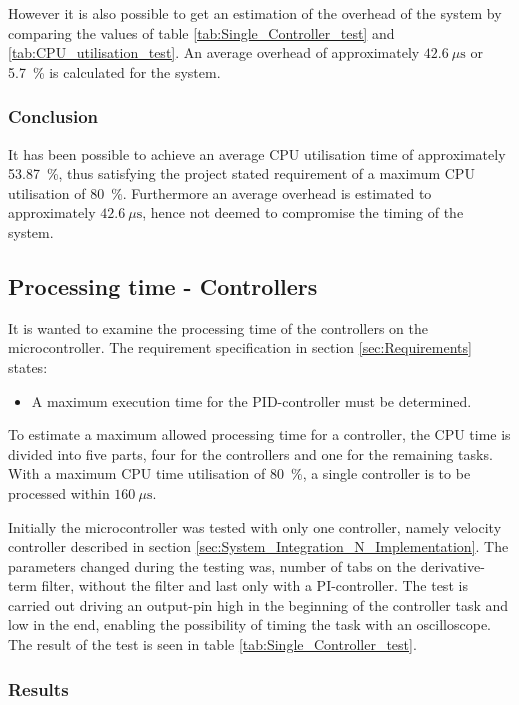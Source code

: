 \documentclass[../../main.tex]{subfiles}
\begin{document}
However it is also possible to get an estimation of the overhead of the system by comparing the values of table \ref{tab:Single_Controller_test} and \ref{tab:CPU_utilisation_test}. An average overhead of approximately $\SI{42,6}{\mu\second}$ or \SI{5,7}{\percent} is calculated for the system.

\subsubsection*{Conclusion}
It has been possible to achieve an average CPU utilisation time of approximately \SI{ 53,87}{\percent}, thus satisfying the project stated requirement of a maximum CPU utilisation of \SI{80}{\percent}. Furthermore an average overhead is estimated to approximately $\SI{42,6}{\mu\second}$, hence not deemed to compromise the timing of the system.

\subsection{Processing time - Controllers}
It is wanted to examine the processing time of the controllers on the microcontroller. The requirement specification in section \ref{sec:Requirements} states:
\begin{itemize}
    \item A maximum execution time for the PID-controller must be determined.
\end{itemize}
To estimate a maximum allowed processing time for a controller, the CPU time is divided into five parts, four for the controllers and one for the remaining tasks. With a maximum CPU time utilisation of \SI{80}{\percent}, a single controller is to be processed within $\SI{160}{\mu\second}$.

Initially the microcontroller was tested with only one controller, namely velocity controller described in section \ref{sec:System_Integration_N_Implementation}. The parameters changed during the testing was, number of tabs on the derivative-term filter, without the filter and last only with a PI-controller. The test is carried out driving an output-pin high in the beginning of the controller task and low in the end, enabling the possibility of timing the task with an oscilloscope. The result of the test is seen in table \ref{tab:Single_Controller_test}.

\subsubsection*{Results}
\end{document}
